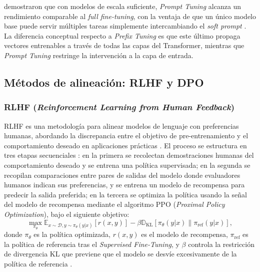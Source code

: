 \textcite{lester-etal-2021-power} demostraron que con modelos de escala suficiente, \textit{Prompt Tuning} alcanza un rendimiento comparable al \textit{full fine-tuning}, con la ventaja de que un único modelo base puede servir múltiples tareas simplemente intercambiando el \textit{soft prompt} \parencite[p.~3046]{lester-etal-2021-power}. La diferencia conceptual respecto a \textit{Prefix Tuning} es que este último propaga vectores entrenables a través de todas las capas del Transformer, mientras que \textit{Prompt Tuning} restringe la intervención a la capa de entrada.

\subsection{Métodos de alineación: RLHF y DPO}

\subsubsection{RLHF (\textit{Reinforcement Learning from Human Feedback})}

RLHF es una metodología para alinear modelos de lenguaje con preferencias humanas, abordando la discrepancia entre el objetivo de pre-entrenamiento y el comportamiento deseado en aplicaciones prácticas \parencite{ouyang2022traininglanguagemodelsfollow}. El proceso se estructura en tres etapas secuenciales \parencite[p.~6]{ouyang2022traininglanguagemodelsfollow}: en la primera se recolectan demostraciones humanas del comportamiento deseado y se entrena una política supervisada; en la segunda se recopilan comparaciones entre pares de salidas del modelo donde evaluadores humanos indican sus preferencias, y se entrena un modelo de recompensa para predecir la salida preferida; en la tercera se optimiza la política usando la señal del modelo de recompensa mediante el algoritmo PPO (\textit{Proximal Policy Optimization}), bajo el siguiente objetivo:
\begin{equation}
\max_{\pi_\theta} \mathbb{E}_{x \sim \mathcal{D}, y \sim \pi_\theta(y|x)}[r(x,y)] - \beta \mathbb{D}_{\text{KL}}[\pi_\theta(y|x) \| \pi_{\text{ref}}(y|x)],
\end{equation}
donde $\pi_\theta$ es la política optimizada, $r(x,y)$ es el modelo de recompensa, $\pi_{\text{ref}}$ es la política de referencia tras el \textit{Supervised Fine-Tuning}, y $\beta$ controla la restricción de divergencia KL que previene que el modelo se desvíe excesivamente de la política de referencia \parencite[p.~3]{rafailov2023direct}.

